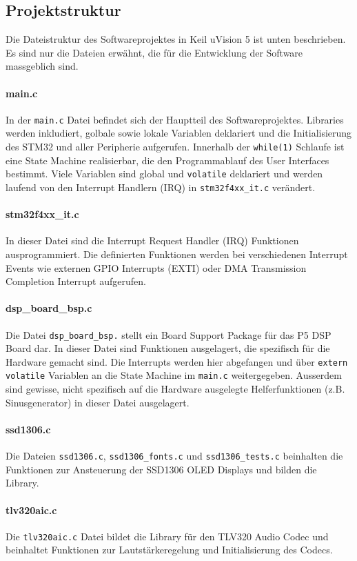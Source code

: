 \subsection{Projektstruktur}
\label{sec:SWProjekt}

Die Dateistruktur des Softwareprojektes in Keil uVision 5 ist unten beschrieben. 
Es sind nur die Dateien erwähnt, die für die Entwicklung der Software massgeblich sind.

\paragraph{main.c}

In der \texttt{main.c} Datei befindet sich der Hauptteil des Softwareprojektes.
Libraries werden inkludiert, golbale sowie lokale Variablen deklariert und die Initialisierung des STM32 und aller Peripherie aufgerufen.
Innerhalb der \texttt{while(1)} Schlaufe ist eine State Machine realisierbar, die den Programmablauf des User Interfaces bestimmt.
Viele Variablen sind global und \texttt{volatile} deklariert und werden laufend von den Interrupt Handlern (IRQ) in \texttt{stm32f4xx\_it.c} verändert.

\paragraph{stm32f4xx\_it.c}

In dieser Datei sind die Interrupt Request Handler (IRQ) Funktionen ausprogrammiert.
Die definierten Funktionen werden bei verschiedenen Interrupt Events wie externen GPIO Interrupts (EXTI) oder DMA Transmission Completion Interrupt aufgerufen.

\paragraph{dsp\_board\_bsp.c}

Die Datei \texttt{dsp\_board\_bsp.} stellt ein Board Support Package für das P5 DSP Board dar.
In dieser Datei sind Funktionen ausgelagert, die spezifisch für die Hardware gemacht sind.
Die Interrupts werden hier abgefangen und über \texttt{extern volatile} Variablen an die State Machine im \texttt{main.c} weitergegeben.
Ausserdem sind gewisse, nicht spezifisch auf die Hardware ausgelegte Helferfunktionen (z.B. Sinusgenerator) in dieser Datei ausgelagert.

\paragraph{ssd1306.c}

Die Dateien \texttt{ssd1306.c}, \texttt{ssd1306\_fonts.c} und \texttt{ssd1306\_tests.c} beinhalten die Funktionen zur Ansteuerung der SSD1306 OLED Displays und bilden die Library.

\paragraph{tlv320aic.c}

Die \texttt{tlv320aic.c} Datei bildet die Library für den TLV320 Audio Codec und beinhaltet Funktionen zur Lautstärkeregelung und Initialisierung des Codecs.



